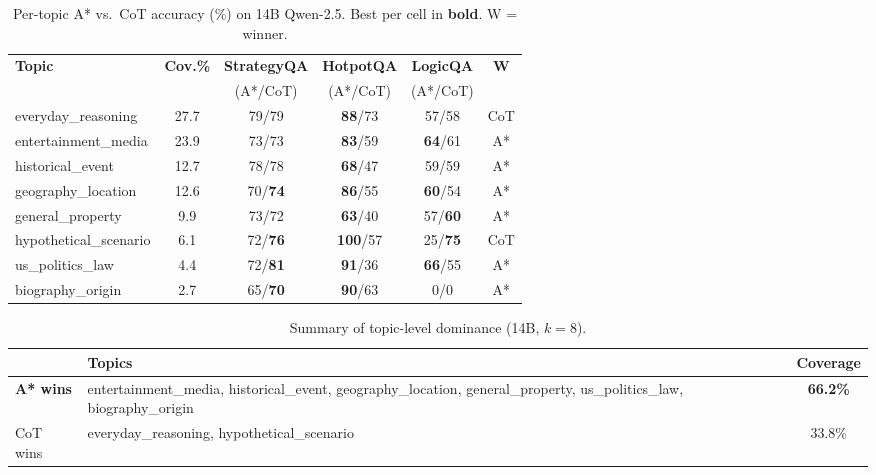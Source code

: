 \documentclass{article}
\begin{document}
\begin{table}[t]
\centering
\caption{Per-topic A* vs.\ CoT accuracy (\%) on 14B Qwen-2.5.
Best per cell in \textbf{bold}.  W = winner.}
\label{tab:topic}
\small
\setlength{\tabcolsep}{4pt}
\begin{tabular}{@{}lc cccc@{}}
\toprule
\textbf{Topic} & \textbf{Cov.\%} & \textbf{StrategyQA} & \textbf{HotpotQA}
  & \textbf{LogicQA} & \textbf{W} \\
& & (A*/CoT) & (A*/CoT) & (A*/CoT) & \\
\midrule
everyday\_reasoning      & 27.7 & 79/79 & \textbf{88}/73 & 57/58 & CoT \\
entertainment\_media     & 23.9 & 73/73 & \textbf{83}/59 & \textbf{64}/61 & A* \\
historical\_event        & 12.7 & 78/78 & \textbf{68}/47 & 59/59 & A* \\
geography\_location      & 12.6 & 70/\textbf{74} & \textbf{86}/55 & \textbf{60}/54 & A* \\
general\_property        &  9.9 & 73/72 & \textbf{63}/40 & 57/\textbf{60} & A* \\
hypothetical\_scenario   &  6.1 & 72/\textbf{76} & \textbf{100}/57 & 25/\textbf{75} & CoT \\
us\_politics\_law        &  4.4 & 72/\textbf{81} & \textbf{91}/36 & \textbf{66}/55 & A* \\
biography\_origin        &  2.7 & 65/\textbf{70} & \textbf{90}/63 & 0/0 & A* \\
\bottomrule
\end{tabular}
\end{table}

\begin{table}[t]
\centering
\caption{Summary of topic-level dominance (14B, $k{=}8$).}
\label{tab:dominance}
\small
\begin{tabular}{@{}lp{7.5cm}c@{}}
\toprule
& \textbf{Topics} & \textbf{Coverage} \\
\midrule
\textbf{A* wins} & entertainment\_media, historical\_event,
  geography\_location, general\_property, us\_politics\_law,
  biography\_origin & \textbf{66.2\%} \\[4pt]
CoT wins & everyday\_reasoning, hypothetical\_scenario & 33.8\% \\
\bottomrule
\end{tabular}
\end{table}
\end{document}
